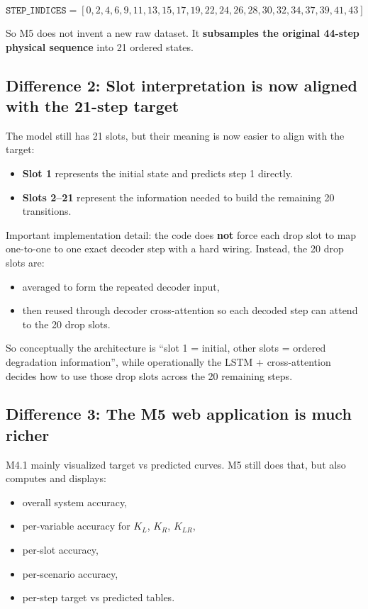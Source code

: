 \documentclass[11pt,a4paper]{article}
\begin{document}
$$
\texttt{STEP\_INDICES} = [0, 2, 4, 6, 9, 11, 13, 15, 17, 19, 22, 24, 26, 28, 30, 32, 34, 37, 39, 41, 43]
$$

So M5 does not invent a new raw dataset. It \textbf{subsamples the original 44-step physical sequence} into 21 ordered states.

\subsection*{Difference 2: Slot interpretation is now aligned with the 21-step target}
The model still has 21 slots, but their meaning is now easier to align with the target:

\begin{itemize}[nosep]
    \item \textbf{Slot 1} represents the initial state and predicts step 1 directly.
    \item \textbf{Slots 2--21} represent the information needed to build the remaining 20 transitions.
\end{itemize}

Important implementation detail: the code does \textbf{not} force each drop slot to map one-to-one to one exact decoder step with a hard wiring. Instead, the 20 drop slots are:
\begin{itemize}[nosep]
    \item averaged to form the repeated decoder input,
    \item then reused through decoder cross-attention so each decoded step can attend to the 20 drop slots.
\end{itemize}

So conceptually the architecture is ``slot 1 = initial, other slots = ordered degradation information'', while operationally the LSTM + cross-attention decides how to use those drop slots across the 20 remaining steps.

\subsection*{Difference 3: The M5 web application is much richer}
M4.1 mainly visualized target vs predicted curves. M5 still does that, but also computes and displays:

\begin{itemize}[nosep]
    \item overall system accuracy,
    \item per-variable accuracy for $K_L$, $K_R$, $K_{LR}$,
    \item per-slot accuracy,
    \item per-scenario accuracy,
    \item per-step target vs predicted tables.
\end{itemize}
\end{document}

